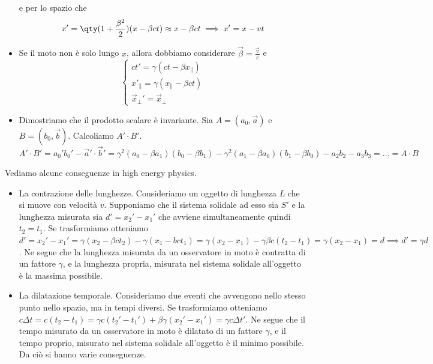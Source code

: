 \begin{itemize}
    e per lo spazio che 
    \begin{equation*}
        x'=\qty(1+\frac{\beta^2}2)(x-\beta ct)\approx x-\beta ct\implies x'= x - vt
    \end{equation*}
    \item Se il moto non è solo lungo $x$, allora dobbiamo considerare $\vec\beta=\frac{\vec v} c$ e 
    \begin{equation*}
        \begin{cases}
            ct'=\gamma(ct-\beta x_\parallel) \\
            x'_\parallel=\gamma(x_\parallel-\beta ct)\\
            \vec x_\perp'=\vec x_\perp
        \end{cases}
    \end{equation*}
    \item Dimostriamo che il prodotto scalare è invariante. Sia $A=(a_0,\vec a)$ e $B=(b_0,\vec b)$. Calcoliamo $A'\cdot B'$.
    \begin{equation*}
        A'\cdot B'=a_0'b_0'-\vec a'\cdot\vec b'=\gamma^2(a_0-\beta a_1)(b_0-\beta b_1)-\gamma^2(a_1-\beta a_0)(b_1-\beta b_0)-a_2b_2-a_3b_3=\dots=A\cdot B
    \end{equation*}
\end{itemize}
Vediamo alcune conseguenze in high energy physics.
\begin{itemize}
    \item La contrazione delle lunghezze. Consideriamo un oggetto di lunghezza $L$ che si muove con velocità $v$. Supponiamo che il sistema solidale ad esso sia $S'$ e la lunghezza misurata sia $d'=x_2'-x_1'$ che avviene simultaneamente quindi $t_2=t_1$. Se trasformiamo otteniamo $d'=x_2'-x_1'=\gamma(x_2-\beta ct_2)-\gamma(x_1-bct_1)=\gamma(x_2-x_1)-\gamma\beta c(t_2-t_1)=\gamma(x_2-x_1)=d\implies d'=\gamma d$. Ne segue che la lunghezza misurata da un osservatore in moto è contratta di un fattore $\gamma$, e la lunghezza propria, misurata nel sistema solidale all'oggetto è la massima possibile.
    \item La dilatazione temporale. Consideriamo due eventi che avvengono nello stesso punto nello spazio, ma in tempi diversi. Se trasformiamo otteniamo $c\Delta t=c(t_2-t_1)=\gamma c(t_2'-t_1')+\beta \gamma (x_2'-x_1')=\gamma c\Delta t'$. Ne segue che il tempo misurato da un osservatore in moto è dilatato di un fattore $\gamma$, e il tempo proprio, misurato nel sistema solidale all'oggetto è il minimo possibile. Da ciò si hanno varie conseguenze.
\end{itemize}
